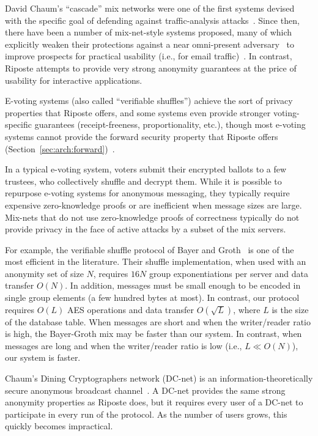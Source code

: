 \documentclass[10pt,twocolumn]{article}
\newcommand{\name}{Riposte\xspace}
\newcommand{\Name}{Riposte\xspace}
\begin{document}
David Chaum's ``cascade'' mix networks were one of the
first systems devised with the specific goal of defending
against traffic-analysis attacks~\cite{chaum1981untraceable}.
Since then, there have been a number of mix-net-style systems proposed, 
many of which explicitly weaken 
their protections against a near omni-present adversary~\cite{syverson2013why}
to improve prospects for practical usability 
(i.e., for email traffic)~\cite{danezis2003mixminion}.
In contrast, \Name attempts to provide very strong anonymity guarantees
at the price of usability for interactive applications.


E-voting systems (also called ``verifiable shuffles'')
achieve the sort of privacy properties that \name 
offers, and some systems even provide stronger 
voting-specific guarantees 
(receipt-freeness, proportionality, etc.),
though most e-voting systems cannot provide
the forward security property that \name offers (Section~\ref{sec:arch:forward})~\cite{adida2008helios,clarkson2007civitas,neff2001verifiable,groth2007verifiable,furukawa2004efficient,groth2010verifiable,rabin2014efficient}.

In a typical e-voting system, voters submit their encrypted ballots
to a few trustees, who collectively shuffle and decrypt them.
While it is possible to repurpose e-voting systems for anonymous messaging,
they typically require expensive zero-knowledge proofs 
or are inefficient when message sizes are large.
Mix-nets that do not use zero-knowledge proofs of correctness
typically do not provide privacy in the face of active attacks 
by a subset of the mix servers. 

For example, the verifiable shuffle protocol of 
Bayer and Groth~\cite{bayer2012efficient}
is one of the most efficient in the literature.
Their shuffle implementation, when used with 
an anonymity set of size $N$, requires $16N$ group 
exponentiations per server and data
transfer $O(N)$.
In addition, messages must be small enough to be encoded
in single group elements (a few hundred bytes at most).
In contrast, our protocol requires $O(L)$ AES operations and
data transfer $O(\sqrt{L})$, where $L$ is the size of the
database table.
When messages are short and when the writer/reader ratio
is high, the Bayer-Groth mix may be faster than our system.
In contrast, when messages are long and when the writer/reader
ratio is low (i.e., $L \ll O(N)$), our system is faster.

Chaum's Dining Cryptographers network
(DC-net) is an information-theoretically secure
anonymous broadcast channel~\cite{chaum1988dining}.
A DC-net provides the same strong anonymity properties
as \name does, but it requires every user of a DC-net
to participate in every run of the protocol.
As the number of users grows, this quickly becomes impractical.
\end{document}

